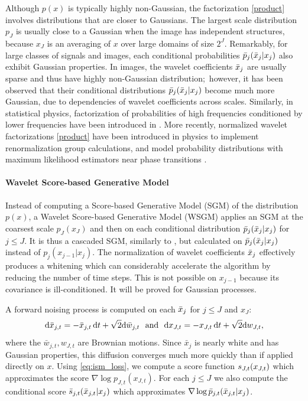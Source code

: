 \documentclass{article}
\begin{document}
Although $p(x)$ is typically highly non-Gaussian, the factorization
\eqref{product} involves distributions that are closer to Gaussians.  The
largest scale distribution $p_{J}$ is usually close to a Gaussian when the image
has independent structures, because $x_J$ is an averaging of $x$ over large
domains of size $2^J$.  Remarkably, for large classes of signals and images,
each conditional probabilities
$\bar p_j ({\bar x}_j | x_j)$ also
exhibit Gaussian properties.  In images, the wavelet coefficients ${\bar x}_j$ are
usually sparse and thus have highly non-Gaussian distribution; however, it has
been observed \citep{wainwright1999scale} that their conditional distributions
$\bar p_j ({\bar x}_j | x_j)$ become much more Gaussian, due to dependencies of
wavelet coefficients across scales.  Similarly, in statistical physics,
factorization of probabilities of high frequencies 
conditioned by lower frequencies have been introduced in
\cite{wilson1983renormalization}. More recently, normalized wavelet
factorizations \eqref{product} have been introduced in physics to implement
renormalization group calculations, and model probability distributions with
maximum likelihood estimators near phase transitions \citep{WCRG}.


\paragraph{Wavelet Score-based Generative Model} 
Instead of computing a Score-based Generative Model (SGM) of the distribution
$p(x)$, a Wavelet Score-based Generative Model (WSGM) applies an SGM at the
coarsest scale $p_J (x_J)$ and then on each conditional distribution
$\bar p_j ({\bar x}_j | x_j)$ for $j \leq J$.  It is thus a cascaded SGM, similarly
to \cite{ho2022cascaded,saharia2021image}, but calculated on
$\bar p_j ({\bar x}_j | x_j)$ instead of $p_j (x_{j-1}|x_j)$.  The normalization of
wavelet coefficients ${\bar x}_j$ effectively produces a whitening which can
considerably accelerate the algorithm by reducing the number of time steps. This
is not possible on $x_{j-1}$ because its covariance is ill-conditioned. It will
be proved for Gaussian processes.

A forward noising process is computed on each ${\bar x}_j$ for $j \leq J$ and $x_J$:
\begin{equation}\label{eq:noisingscales}
  \mathrm{d} {\bar x}_{j,t} = -{\bar x}_{j,t} \,\mathrm{d} t + \sqrt{2} \mathrm{d} \bar{w}_{j,t}~~\mbox{and}~~
  \mathrm{d} x_{J,t} = -x_{J,t} \,\mathrm{d} t + \sqrt{2} \mathrm{d} w_{J,t},
\end{equation}
where the $\bar{w}_{j,t}, w_{J,t}$ are Brownian motions.  Since $\bar{x}_j$ is
nearly white and has Gaussian properties, this diffusion converges much more
quickly than if applied directly on $x$.  Using \eqref{eq:ism_loss}, we compute a
score function ${{s}}_{J,t}(x_{J,t})$ which approximates the score
$\nabla \log p_{J,t}(x_{J,t})$. For each $j \leq J$ we also compute the
conditional score $\bar {{s}}_{j,t} ({\bar x}_{j,t} | x_{j})$ which
approximates $\nabla \log \bar p_{j,t}({\bar x}_{j,t} | x_{j})$.
\end{document}

